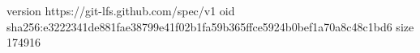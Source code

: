 version https://git-lfs.github.com/spec/v1
oid sha256:e3222341de881fae38799e41f02b1fa59b365ffce5924b0bef1a70a8c48c1bd6
size 174916
